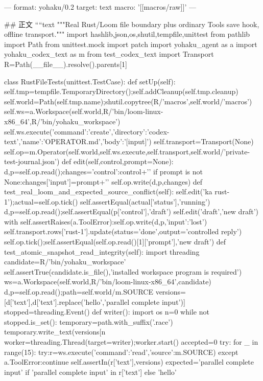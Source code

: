---
format: yohaku/0.2
target: text
macro: '[[macros/raw]]'
---

## 正文
````text
"""Real Rust/Loom file boundary plus ordinary Tools save hook, offline transport."""
import hashlib,json,os,shutil,tempfile,unittest
from pathlib import Path
from unittest.mock import patch
import yohaku_agent as a
import yohaku_codex_text as m
from test_codex_text import Transport
R=Path(__file__).resolve().parents[1]

class RustFileTests(unittest.TestCase):
 def setUp(self):
  self.tmp=tempfile.TemporaryDirectory();self.addCleanup(self.tmp.cleanup)
  self.world=Path(self.tmp.name);shutil.copytree(R/'macros',self.world/'macros')
  self.ws=a.Workspace(self.world,R/'bin/loom-linux-x86_64',R/'bin/yohaku_workspace')
  self.ws.execute({'command':'create','directory':'codex-text','name':'OPERATOR.md','body':'[input]\nhello\n[/input]\n[control]\ndraft\n[/control]\n[result]\n{}\n[/result]\n'})
  self.transport=Transport(None)
  self.op=m.Operator(self.world,self.ws.execute,self.transport,self.world/'private-test-journal.json')
 def edit(self,control,prompt=None):
  d,p=self.op.read();changes={'control':control+'\n'}
  if prompt is not None:changes['input']=prompt+'\n'
  self.op.write(d,p,changes)
 def test_real_loom_and_expected_source_conflict(self):
  self.edit('ka rust-1');actual=self.op.tick()
  self.assertEqual(actual['status'],'running')
  d,p=self.op.read();self.assertEqual(p['control'],'draft')
  self.edit('draft','new draft')
  with self.assertRaises(a.ToolError):self.op.write(d,p,{'input':'lost\n'})
  self.transport.rows['rust-1'].update(status='done',output='controlled reply')
  self.op.tick();self.assertEqual(self.op.read()[1]['prompt'],'new draft')
 def test_atomic_snapshot_read_integrity(self):
  import threading
  candidate=R/'bin/yohaku_workspace'
  self.assertTrue(candidate.is_file(),'installed workspace program is required')
  ws=a.Workspace(self.world,R/'bin/loom-linux-x86_64',candidate)
  d,p=self.op.read();path=self.world/m.SOURCE
  versions=[d['text'],d['text'].replace('hello','parallel complete input')]
  stopped=threading.Event()
  def writer():
   import os
   n=0
   while not stopped.is_set():
    temporary=path.with_suffix('.race')
    temporary.write_text(versions[n%
  worker=threading.Thread(target=writer);worker.start()
  accepted=0
  try:
   for _ in range(15):
    try:r=ws.execute({'command':'read','source':m.SOURCE})
    except a.ToolError:continue
    self.assertIn(r['text'],versions)
    expected='parallel complete input' if 'parallel complete input' in r['text'] else 'hello'
